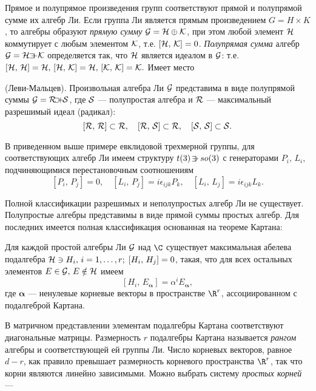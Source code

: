 \documentclass[a4paper
]{article}
\begin{document}
Прямое и полупрямое произведения групп соответствуют прямой и
полупрямой сумме их алгебр Ли. Если группа Ли является прямым
произведением $G=H\times K$, то алгебры образуют {\em прямую
сумму} ${\cal G}={\cal H}\oplus{\cal K}$, при этом любой элемент
${\cal H}$ коммутирует с любым элементом ${\cal K}$, т.е. $[{\cal
H},\,{\cal K}]=0$. {\em Полупрямая сумма} алгебр ${\cal G}={\cal
H}\, +\hspace{-4.6mm}\supset {\cal K}$ определяется так, что
${\cal H}$ является идеалом в ${\cal G}$: т.е. $[{\cal H},\,{\cal
H}]={\cal H},\,[{\cal H},\,{\cal K}]={\cal H},\,[{\cal K},\,{\cal
K}]={\cal K}.$ Имеет место
\begin{Trm}(Леви-Мальцев). Произвольная алгебра Ли ${\cal G}$
представима в виде полупрямой суммы  ${\cal G}={\cal R}\,
+\hspace{-5.2mm}\supset{\cal S}$, где ${\cal S}$  --- полупростая
алгебра и ${\cal R}$ --- максимальный разрешимый идеал (радикал):
$$[{\cal R},\,{\cal R}]\subset{\cal R},\quad
[{\cal R},\,{\cal S}]\subset{\cal R},\quad[{\cal S},\,{\cal
S}]\subset{\cal S}.$$\end{Trm} \noindent В приведенном выше
примере евклидовой трехмерной группы, для соответствующих алгебр
Ли имеем структуру $t(3)\, +\hspace{-4mm}\supset so(3)$  с
генераторами $P_i,\,L_i$, подчиняющимися перестановочным
соотношениям
$$[P_i,\,P_j]=0,\quad
[L_i,\,P_j]=i\epsilon_{ijk}P_k,\quad
[L_i,\,L_j]=i\epsilon_{ijk}L_k.$$
\par
Полной классификации разрешимых и неполупростых алгебр Ли не
существует. Полупростые алгебры представимы в виде прямой суммы
простых алгебр. Для последних имеется полная классификация
основанная на теореме Картана:
\begin{Trm}
Для каждой  простой алгебры Ли ${ \cal G}$ над $\C$  существует
максимальная абелева подалгебра  ${\cal H}\ni H_i,\,i=1,\ldots,
r;\;[H_i,\,H_j]=0$, такая, что для всех остальных элементов $E\in
{\cal G},\,E\notin {\cal H}$  имеем
$$[H_i,\, E_{{\bm \alpha}}]=\alpha^i E_{{\bm \alpha}},$$ где ${\bm
\alpha}$ ---  ненулевые  корневые векторы  в пространстве $\R^r$,
ассоциированном с подалгеброй Картана.
\end{Trm} В матричном представлении элементам подалгебры Картана соответствуют
диагональные матрицы. Размерность $r$ подалгебры Картана называется
{\em рангом} алгебры и соответствующей ей группы Ли. Число
корневых векторов, равное $d-r$, как правило превышает размерность
корневого пространства $\R^r$, так что корни являются линейно
зависимыми. Можно выбрать систему {\em простых корней} ---
\end{document}
